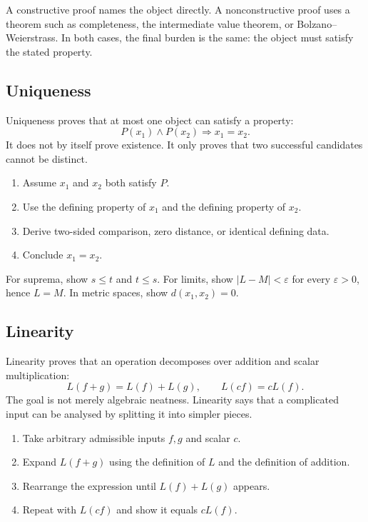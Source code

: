 \begin{remark}
A constructive proof names the object directly. A nonconstructive proof uses
a theorem such as completeness, the intermediate value theorem, or
Bolzano--Weierstrass. In both cases, the final burden is the same: the object
must satisfy the stated property.
\end{remark}

\subsection*{Uniqueness}
\label{subsec:property-uniqueness}

Uniqueness proves that at most one object can satisfy a property:
\[
  P(x_1)\land P(x_2)\Rightarrow x_1=x_2.
\]
It does not by itself prove existence. It only proves that two successful
candidates cannot be distinct.

\begin{remark}
\begin{enumerate}
  \item Assume $x_1$ and $x_2$ both satisfy $P$.
  \item Use the defining property of $x_1$ and the defining property of $x_2$.
  \item Derive two-sided comparison, zero distance, or identical defining
        data.
  \item Conclude $x_1=x_2$.
\end{enumerate}
\end{remark}

\begin{remark}
For suprema, show $s\leq t$ and $t\leq s$. For limits, show
$|L-M|<\varepsilon$ for every $\varepsilon>0$, hence $L=M$. In metric spaces,
show $d(x_1,x_2)=0$.
\end{remark}

\subsection*{Linearity}
\label{subsec:property-linearity}

Linearity proves that an operation decomposes over addition and scalar
multiplication:
\[
  L(f+g)=L(f)+L(g),
  \qquad
  L(cf)=cL(f).
\]
The goal is not merely algebraic neatness. Linearity says that a complicated
input can be analysed by splitting it into simpler pieces.

\begin{remark}
\begin{enumerate}
  \item Take arbitrary admissible inputs $f,g$ and scalar $c$.
  \item Expand $L(f+g)$ using the definition of $L$ and the definition of
        addition.
  \item Rearrange the expression until $L(f)+L(g)$ appears.
  \item Repeat with $L(cf)$ and show it equals $cL(f)$.
\end{enumerate}
\end{remark}


